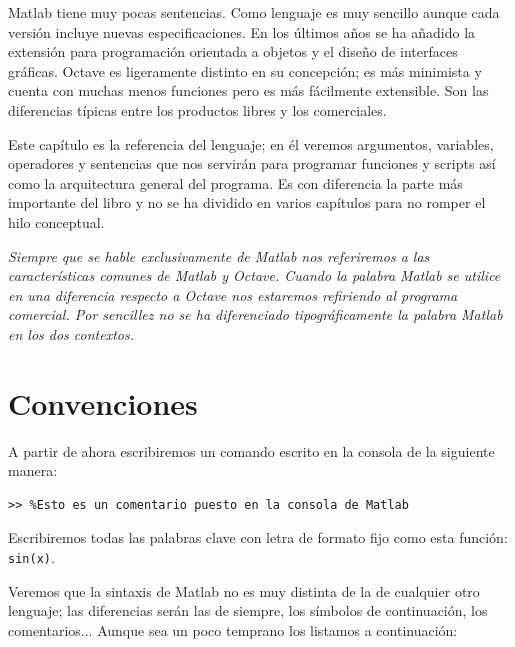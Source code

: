 Matlab tiene muy pocas sentencias. Como lenguaje es muy sencillo
aunque cada versión incluye nuevas especificaciones. En los últimos
años se ha añadido la extensión para programación orientada a objetos
y el diseño de interfaces gráficas. Octave es ligeramente distinto en
su concepción; es más minimista y cuenta con muchas menos funciones
pero es más fácilmente extensible. Son las diferencias típicas entre
los productos libres y los comerciales.

Este capítulo es la referencia del lenguaje; en él veremos argumentos,
variables, operadores y sentencias que nos servirán para programar
funciones y scripts así como la arquitectura general del programa.  Es
con diferencia la parte más importante del libro y no se ha dividido
en varios capítulos para no romper el hilo conceptual.

\emph{Siempre que se hable exclusivamente de Matlab nos referiremos a
  las características comunes de Matlab y Octave. Cuando la palabra
  Matlab se utilice en una diferencia respecto a Octave nos estaremos
  refiriendo al programa comercial. Por sencillez no se ha
  diferenciado tipográficamente la palabra Matlab en los dos
  contextos.}


\section{Convenciones}

A partir de ahora escribiremos un comando escrito en la consola de la
siguiente manera:

\begin{verbatim}
>> %Esto es un comentario puesto en la consola de Matlab
\end{verbatim}
Escribiremos todas las palabras clave con letra de formato fijo como
esta función: \texttt{sin(x)}.

Veremos que la sintaxis de Matlab no es muy distinta de la de
cualquier otro lenguaje; las diferencias serán las de siempre, los
símbolos de continuación, los comentarios... Aunque sea un poco
temprano los listamos a continuación:

